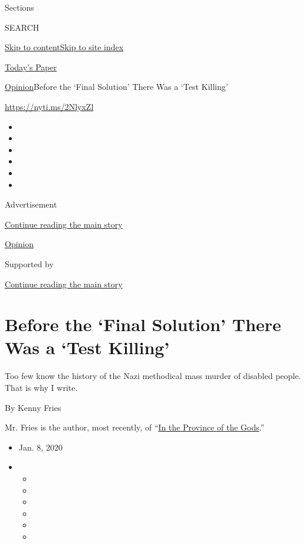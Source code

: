 Sections

SEARCH

\protect\hyperlink{site-content}{Skip to
content}\protect\hyperlink{site-index}{Skip to site index}

\href{https://myaccount.nytimes.com/auth/login?response_type=cookie\&client_id=vi}{}

\href{https://www.nytimes.com/section/todayspaper}{Today's Paper}

\href{/section/opinion}{Opinion}\textbar{}Before the `Final Solution'
There Was a `Test Killing'

\href{https://nyti.ms/2NlyxZl}{https://nyti.ms/2NlyxZl}

\begin{itemize}
\item
\item
\item
\item
\item
\item
\end{itemize}

Advertisement

\protect\hyperlink{after-top}{Continue reading the main story}

\href{/section/opinion}{Opinion}

Supported by

\protect\hyperlink{after-sponsor}{Continue reading the main story}

\hypertarget{before-the-final-solution-there-was-a-test-killing}{%
\section{Before the `Final Solution' There Was a `Test
Killing'}\label{before-the-final-solution-there-was-a-test-killing}}

Too few know the history of the Nazi methodical mass murder of disabled
people. That is why I write.

By Kenny Fries

Mr. Fries is the author, most recently, of
``\href{https://uwpress.wisc.edu/books/5638.htm}{In the Province of the
Gods}.''

\begin{itemize}
\item
  Jan. 8, 2020
\item
  \begin{itemize}
  \item
  \item
  \item
  \item
  \item
  \item
  \end{itemize}
\end{itemize}

